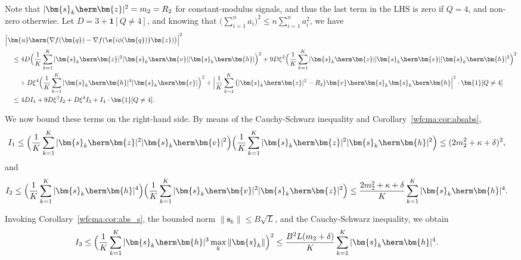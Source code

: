 Note that $|\bm{s}_k\herm\bm{z}|^2=m_2=R_2$ for constant-modulus signals, and thus the last term in the LHS is zero if $Q=4$, and non-zero otherwise. Let $D=3+\bm{1}[Q\neq4]$, and knowing that $\big(\sum_{i=1}^n a_i\big)^2\leq n\sum_{i=1}^n a_i^2$, we have
\begin{align}
	&\Big|\bm{u}\herm\big(\nabla f(\bm{q})-\nabla f(\e{i\phi(\bm{q})}\bm{z})\big)\Big|^2\nonumber\\
 	&\quad
	\leq 4D\Big(\frac{1}{K}\sum_{k=1}^K|\bm{s}_k\herm\bm{z}|^2|\bm{s}_k\herm\bm{v}||\bm{s}_k\herm\bm{h}|\Big)^2  
	+9D\xi^2\Big(\frac{1}{K}\sum_{k=1}^K|\bm{s}_k\herm\bm{z}||\bm{s}_k\herm\bm{v}||\bm{s}_k\herm\bm{h}|^2\Big)^2
	\nonumber\\&\qquad
	+D\xi^4\Big(\frac{1}{K}\sum_{k=1}^K|\bm{s}_k\herm\bm{h}|^3|\bm{s}_k\herm\bm{v}|\Big)^2
	+\Big|\frac{1}{K}\sum_{k=1}^K\big(|\bm{s}_k\herm\bm{z}|^2-R_2\big)\bm{v}\herm\bm{s}_k\bm{s}_k\herm\bm{h}\Big|^2\cdot\bm{1}[Q\neq4]\nonumber\\
	&\quad\leq 4DI_1+9D\xi^2I_2+D\xi^4I_3+I_4\cdot\bm{1}[Q\neq4].\nonumber
\end{align}

We now bound these terms on the right-hand side. By means of the Cauchy-Schwarz inequality and Corollary~\ref{wfcma:cor:absabs},
\begin{align}
	I_1&\leq\Big(\frac{1}{K}\sum_{k=1}^K|\bm{s}_k\herm\bm{z}|^2|\bm{s}_k\herm\bm{v}|^2\Big)\Big(\frac{1}{K}\sum_{k=1}^K|\bm{s}_k\herm\bm{z}|^2|\bm{s}_k\herm\bm{h}|^2\Big)
	\leq(2  m_2^2+\kappa+\delta)^2,\nonumber
\end{align}
and
\begin{align}
	I_2&\leq\Big(\frac{1}{K}\sum_{k=1}^K|\bm{s}_k\herm\bm{h}|^4\Big)\Big(\frac{1}{K}\sum_{k=1}^K|\bm{s}_k\herm\bm{v}|^2|\bm{s}_k\herm\bm{z}|^2\Big)
	\leq\frac{2  m_2^2+\kappa+\delta}{K}\sum_{k=1}^K|\bm{s}_k\herm\bm{h}|^4.\nonumber
\end{align}

Invoking Corollary~\ref{wfcma:cor:abs_s}, the bounded norm $\|\bm{s}_k\|\leq B\sqrt{L}$, and the Cauchy-Schwarz inequality, we obtain
\begin{align}
	I_3&\leq\Big(\frac{1}{K}\sum_{k=1}^K|\bm{s}_k\herm\bm{h}|^3\max_{k}\|\bm{s}_k\|\Big)^2
	\leq\frac{B^2L(  m_2+\delta)}{K}\sum_{k=1}^K|\bm{s}_k\herm\bm{h}|^4.\nonumber
\end{align}


